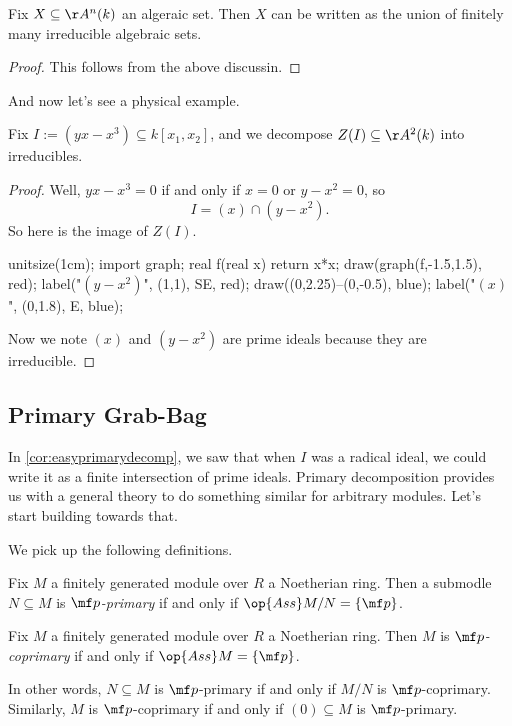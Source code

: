\begin{corollary}
	Fix $X\subseteq\AA^n(k)$ an algeraic set. Then $X$ can be written as the union of finitely many irreducible algebraic sets.
\end{corollary}
\begin{proof}
	This follows from the above discussin.
\end{proof}
And now let's see a physical example.
\begin{exe}
	Fix $I:=\left(yx-x^3\right)\subseteq k[x_1,x_2]$, and we decompose $Z(I)\subseteq\AA^2(k)$ into irreducibles.
\end{exe}
\begin{proof}
	Well, $yx-x^3=0$ if and only if $x=0$ or $y-x^2=0$, so
	\[I=(x)\cap\left(y-x^2\right).\]
	So here is the image of $Z(I)$.
	\begin{center}
		\begin{asy}
			unitsize(1cm);
			import graph;
			real f(real x)
			{
				return x*x;
			}
			draw(graph(f,-1.5,1.5), red);
			label("$\left(y-x^2\right)$", (1,1), SE, red);
			draw((0,2.25)--(0,-0.5), blue);
			label("$(x)$", (0,1.8), E, blue);
		\end{asy}
	\end{center}
	Now we note $(x)$ and $\left(y-x^2\right)$ are prime ideals because they are irreducible.
\end{proof}

\subsection{Primary Grab-Bag}
In \autoref{cor:easyprimarydecomp}, we saw that when $I$ was a radical ideal, we could write it as a finite intersection of prime ideals. Primary decomposition provides us with a general theory to do something similar for arbitrary modules. Let's start building towards that.

We pick up the following definitions.
\begin{definition}
	Fix $M$ a finitely generated module over $R$ a Noetherian ring. Then a submodle $N\subseteq M$ is \textit{$\mf p$-primary} if and only if $\op{Ass}M/N=\{\mf p\}$.
\end{definition}
\begin{definition}
	Fix $M$ a finitely generated module over $R$ a Noetherian ring. Then $M$ is \textit{$\mf p$-coprimary} if and only if $\op{Ass}M=\{\mf p\}$.
\end{definition}
In other words, $N\subseteq M$ is $\mf p$-primary if and only if $M/N$ is $\mf p$-coprimary. Similarly, $M$ is $\mf p$-coprimary if and only if $(0)\subseteq M$ is $\mf p$-primary.


